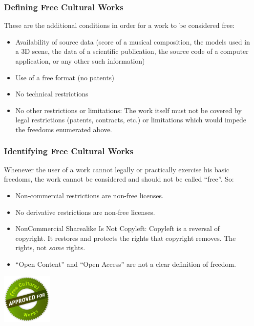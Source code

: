 \begin{frame}
\frametitle{Defining Free Cultural Works}

These are the additional conditions in order for a work to be considered free:

\begin{itemize}
\item \alert{Availability of source data} (score of a musical composition, the models used in a 3D scene, the data of a scientific publication, the source code of a computer application, or any other such information)
\item \alert{Use of a free format} (no patents)
\item \alert{No technical restrictions}
\item \alert{No other restrictions or limitations:} The work itself must not be covered by legal restrictions (patents, contracts, etc.) or limitations which would impede the freedoms enumerated above.
\end{itemize}                                                 

\end{frame}



\begin{frame}
\frametitle{Identifying Free Cultural Works}

Whenever the user of a work cannot legally or practically exercise his basic freedoms, the work cannot be considered and should not be called ``free''. So: 

\begin{itemize}
\item \alert{Non-commercial} restrictions are \alert{non-free} licenses.
\item \alert{No derivative} restrictions are \alert{non-free} licenses. 
\item \alert{NonCommercial Sharealike} Is Not Copyleft: Copyleft is a reversal of copyright. It restores and protects the rights that copyright removes. \alert{The} rights, not \textit{some} rights.
\item ``Open Content'' and ``Open Access'' are \alert{not} a clear definition of freedom. 
\end{itemize}                                                 

\begin{center}
\includegraphics[width=2.5cm]{figs/seal.png}

\end{center}


\end{frame}


